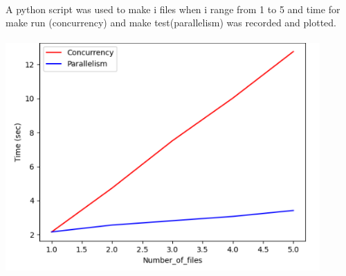 \documentclass[12pt]{article}
\begin{document}
\begin{spacing}{1.2}
\\
A python script was used to make i files when i range from 1 to 5 and time for make run  (concurrency) and make test(parallelism) was recorded and plotted.\\
\\

\includegraphics[width=12cm]{images/31.png}\\


\end{spacing}
\end{document}
